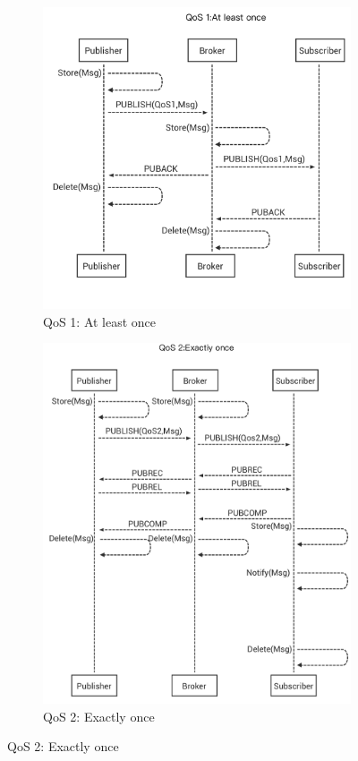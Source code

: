 \documentclass[\main/main.tex]{subfiles}
\begin{document}
\begin{figure}[H]
    \centering
    \begin{subfigure}[b]{0.49\linewidth}
        \centering
        \includegraphics[width=1\textwidth]{mqtt_qos_at_least_once.png}
        \caption{QoS 1: At least once}
        \label{fig:mqtt_qos_1}
    \end{subfigure}
    \begin{subfigure}[b]{0.49\linewidth}
        \centering
        \includegraphics[width=1\textwidth]{mqtt_qos_exact_once.png}
        \caption{QoS 2: Exactly once}
        \label{fig:mqtt_qos_2}
    \end{subfigure}
\end{figure}
\end{document}

